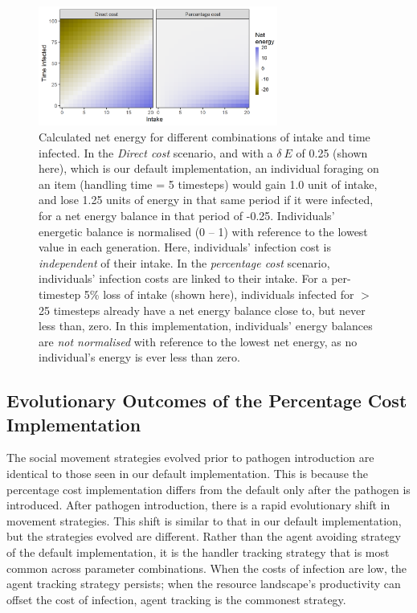\begin{figure}
    \centering
    \includegraphics[width=0.7\textwidth]{figures/pathomove/fig_cost_structure.png}
    \caption{
        Calculated net energy for different combinations of intake and time infected. 
        In the \emph{Direct cost} scenario, and with a $\delta~E$ of 0.25 (shown here), which is our default implementation, an individual foraging on an item (handling time = 5 timesteps) would gain 1.0 unit of intake, and lose 1.25 units of energy in that same period if it were infected, for a net energy balance in that period of -0.25. 
        Individuals' energetic balance is normalised (0 -- 1) with reference to the lowest value in each generation. 
        Here, individuals' infection cost is \emph{independent} of their intake. 
        In the \emph{percentage cost} scenario, individuals' infection costs are linked to their intake. 
        For a per-timestep 5\% loss of intake (shown here), individuals infected for $>$25 timesteps already have a net energy balance close to, but never less than, zero. 
        In this implementation, individuals' energy balances are \emph{not normalised} with reference to the lowest net energy, as no individual's energy is ever less than zero.
    }\label{fig:compare_cost_structure}
\end{figure}

\subsection*{Evolutionary Outcomes of the Percentage Cost Implementation}

The social movement strategies evolved prior to pathogen introduction are identical to those seen in our default implementation.
This is because the percentage cost implementation differs from the default only after the pathogen is introduced.
After pathogen introduction, there is a rapid evolutionary shift in movement strategies.
This shift is similar to that in our default implementation, but the strategies evolved are different.
Rather than the agent avoiding strategy of the default implementation, it is the handler tracking strategy that is most common across parameter combinations.
When the costs of infection are low, the agent tracking strategy persists; when the resource landscape's productivity can offset the cost of infection, agent tracking is the commonest strategy.


